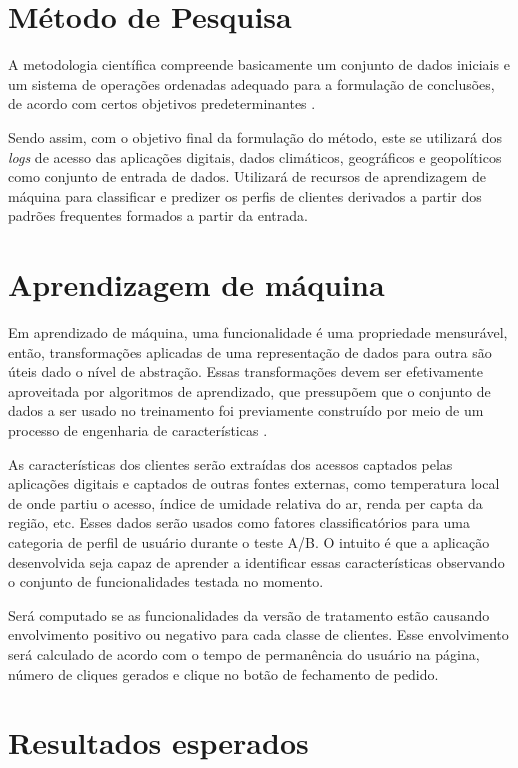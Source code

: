 \documentclass[12pt]{article}
\begin{document}
\section{Método de Pesquisa}

A metodologia científica compreende basicamente um conjunto de dados iniciais e um sistema de operações ordenadas adequado para a formulação de conclusões, de acordo com certos objetivos predeterminantes \cite{tartuce:2006}.

Sendo assim, com o objetivo final da formulação do método, este se utilizará dos \textit{logs} de acesso das aplicações digitais, dados climáticos, geográficos e geopolíticos como conjunto de entrada de dados. Utilizará de recursos de aprendizagem de máquina para classificar e predizer os perfis de clientes derivados a partir dos padrões frequentes formados a partir da entrada.   

\section{Aprendizagem de máquina}

Em aprendizado de máquina, uma funcionalidade é uma propriedade mensurável, então, transformações aplicadas de uma representação de dados para outra são úteis dado o nível de abstração. Essas transformações devem ser efetivamente aproveitada por algoritmos de aprendizado, que pressupõem que o conjunto de dados a ser usado no treinamento foi previamente construído por meio de um processo de engenharia de características \cite{bezerraintroduccao}.

As características dos clientes serão extraídas dos acessos captados pelas aplicações digitais e captados de outras fontes externas, como temperatura local de onde partiu o acesso, índice de umidade relativa do ar, renda per capta da região, etc. Esses dados serão usados como fatores classificatórios para uma categoria de perfil de usuário durante o teste A/B. O intuito é que a aplicação desenvolvida seja capaz de aprender a identificar essas características observando o conjunto de funcionalidades testada no momento.

Será computado se as funcionalidades da versão de tratamento estão causando envolvimento positivo ou negativo para cada classe de clientes. Esse envolvimento será calculado de acordo com o tempo de permanência do usuário na página, número de cliques gerados e clique no botão de fechamento de pedido.

\section{Resultados esperados}
\end{document}
